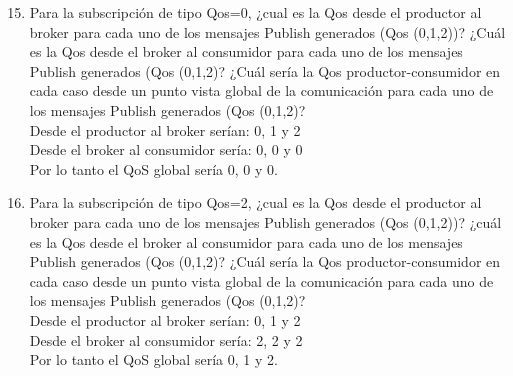 \documentclass[12pt, a4paper]{report}
\begin{document}
\begin{enumerate}
	\setcounter{enumi}{14}
	\item Para la subscripción de tipo Qos=0, ¿cual es la Qos desde el productor al broker para cada uno
	de los mensajes Publish generados (Qos (0,1,2))? ¿Cuál es la Qos desde el broker al consumidor
	para cada uno de los mensajes Publish generados (Qos (0,1,2)? ¿Cuál sería la Qos productor-consumidor en cada caso desde un punto vista global de la comunicación para cada uno de los
	mensajes Publish generados (Qos (0,1,2)?\\
	
	Desde el productor al broker serían: 0, 1 y 2\\
	Desde el broker al consumidor sería: 0, 0 y 0\\
	Por lo tanto el QoS global sería 0, 0 y 0.
	\item Para la subscripción de tipo Qos=2, ¿cual es la Qos desde el productor al broker para cada uno
	de los mensajes Publish generados (Qos (0,1,2))? ¿cuál es la Qos desde el broker al consumidor
	para cada uno de los mensajes Publish generados (Qos (0,1,2)? ¿Cuál sería la Qos productor-consumidor en cada caso desde un punto vista global de la comunicación para cada uno de los
	mensajes Publish generados (Qos (0,1,2)?\\
	
	Desde el productor al broker serían: 0, 1 y 2\\
	Desde el broker al consumidor sería: 2, 2 y 2\\
	Por lo tanto el QoS global sería 0, 1 y 2.
\end{enumerate}
\end{document}
